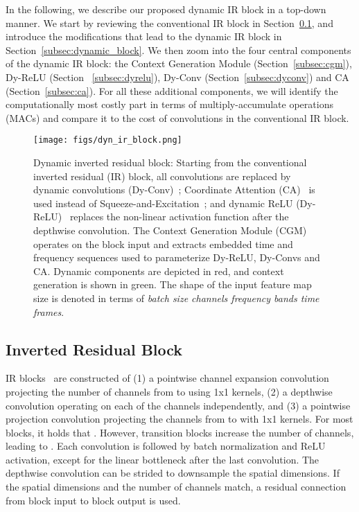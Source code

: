 \documentclass[lettersize,journal]{IEEEtran}
\begin{document}
In the following, we describe our proposed dynamic IR block in a top-down manner. We start by reviewing the conventional IR block in Section~\ref{subsec:inverted_block}, and introduce the modifications that lead to the dynamic IR block in Section~\ref{subsec:dynamic_block}. We then zoom into the four central components of the dynamic IR block: the Context Generation Module (Section~\ref{subsec:cgm}), Dy-ReLU (Section ~\ref{subsec:dyrelu}), Dy-Conv (Section~\ref{subsec:dyconv}) and CA (Section~\ref{subsec:ca}). For all these additional components, we will identify the computationally most costly part in terms of multiply-accumulate operations (MACs) and compare it to the cost of convolutions in the conventional IR block.


\begin{figure}[t]
\centering
{\texttt{[image: figs/dyn\_ir\_block.png]}}
\caption{Dynamic inverted residual block: Starting from the conventional inverted residual (IR) block, all convolutions are replaced by dynamic convolutions (Dy-Conv)~\cite{chen2020dynamic_conv}; Coordinate Attention (CA)~\cite{hou2021coordinate} is used instead of Squeeze-and-Excitation~\cite{Hu18Squeeze}; and dynamic ReLU (Dy-ReLU)~\cite{chen2020dynamic_relu} replaces the non-linear activation function after the depthwise convolution. The Context Generation Module (CGM) operates on the block input and extracts embedded time and frequency sequences used to parameterize Dy-ReLU, Dy-Convs and CA. Dynamic components are depicted in red, and context generation is shown in green. The shape of the input feature map size is denoted in terms of \textit{batch size  channels  frequency bands  time frames}.}\label{fig:dynamic_block}\end{figure}

\subsection{Inverted Residual Block}
\label{subsec:inverted_block}

IR blocks~\cite{Sandler18MobileNetsV2} are constructed of (1) a pointwise channel expansion convolution projecting the number of channels from  to  using 1x1 kernels, (2) a depthwise convolution operating on each of the  channels independently, and (3) a pointwise projection convolution projecting the channels from  to  with 1x1 kernels. For most blocks, it holds that . However, transition blocks increase the number of channels, leading to . Each convolution is followed by batch normalization and ReLU activation, except for the linear bottleneck after the last convolution. The depthwise convolution can be strided to downsample the spatial dimensions. If the spatial dimensions and the number of channels match, a residual connection from block input to block output is used.
\end{document}
